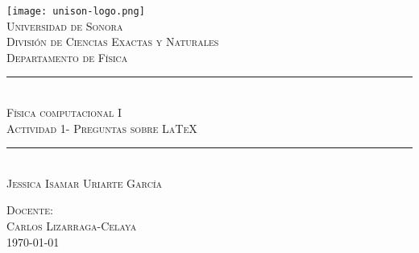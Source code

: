 \documentclass[12pt]{article}
\newcommand{\HRule}{\rule{\linewidth}{0.5mm}}
\begin{document}

\begin{center}


\texttt{[image: unison-logo.png]}~\\[1cm]

\textsc{\LARGE Universidad de Sonora}\\[0.1cm]
\textsc{Divisi\'on de Ciencias Exactas y Naturales}\\[0.1cm]
\textsc{Departamento de F\'isica}\\[1.5cm]

\HRule \\[0.4cm]
\textsc{Física computacional I}\\[0.1cm]
\textsc{Actividad 1- Preguntas sobre \LaTeX}
\HRule \\[1.5cm]





\textsc{Jessica Isamar Uriarte García\\[1.0cm]}

\textsc{Docente:\\Carlos Lizarraga-Celaya\\[0.1cm]}
\vfill
\textsc{\today \\[0.1cm]}
\end{center}
\newpage

\begin{abstract}
\noindent En esta sección responderé una serie de preguntas acerca del tipógrafó electrónico \LaTeX.
\end{abstract}
\end{document}
